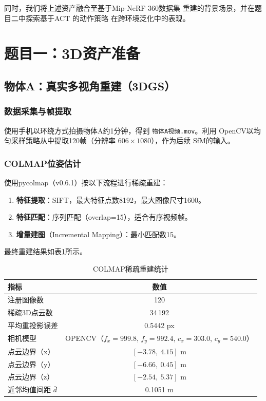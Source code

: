 \documentclass{article}
\begin{document}
同时，我们将上述资产融合至基于Mip-NeRF 360数据集 \cite{barron2022mipnerf360}
重建的背景场景，并在题目二中探索基于ACT \cite{zhao2023learning} 的动作策略
在跨环境泛化中的表现。

\section{题目一：3D资产准备}
\label{sec:task1}

\subsection{物体A：真实多视角重建（3DGS）}
\label{sec:objA}

\subsubsection{数据采集与帧提取}

使用手机以环绕方式拍摄物体A约1分钟，得到 \texttt{物体A视频.mov}。利用
OpenCV以均匀采样策略从中提取120帧（分辨率 $606\times1080$），作为后续
SfM的输入。

\subsubsection{COLMAP位姿估计}

使用pycolmap（v0.6.1）按以下流程进行稀疏重建：
\begin{enumerate}
  \item \textbf{特征提取}：SIFT，最大特征点数8192，最大图像尺寸1600。
  \item \textbf{特征匹配}：序列匹配（overlap=15），适合有序视频帧。
  \item \textbf{增量建图}（Incremental Mapping）：最小匹配数15。
\end{enumerate}

最终重建结果如表\ref{tab:colmap_stats}所示。

\begin{table}[h]
  \centering
  \caption{COLMAP稀疏重建统计}
  \label{tab:colmap_stats}
  \begin{tabular}{lc}
    \toprule
    指标 & 数值 \\
    \midrule
    注册图像数 & 120 \\
    稀疏3D点云数 & 34\,192 \\
    平均重投影误差 & 0.5442 px \\
    相机模型 & OPENCV（$f_x=999.8$, $f_y=992.4$, $c_x=303.0$, $c_y=540.0$） \\
    点云边界（x） & $[-3.78,\ 4.15]$ m \\
    点云边界（y） & $[-6.66,\ 0.45]$ m \\
    点云边界（z） & $[-2.54,\ 5.37]$ m \\
    近邻均值间距 $\bar{d}$ & 0.1051 m \\
    \bottomrule
  \end{tabular}
\end{table}
\end{document}
